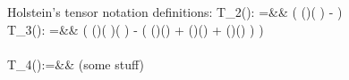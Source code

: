 Holstein's tensor notation definitions:
\bea
\textstyle 
T_2()\!:  \;\;\; \;\;\;
  =&&  \textstyle \!\!\!\! \!\!\!\!
  \left( (\cdot {})( \cdot {}) 
    -   \cdot {} \right)   \\
\textstyle 
T_3()\!: \;\;\; 
  =&&  \textstyle \!\!\!\! \!\!\!\!
  \left( (\cdot {})( \cdot {})( \cdot {}) 
    -  \left( (\cdot {})(\cdot{}) 
                       + (\cdot {})(\cdot{})
                       + (\cdot {})(\cdot{})
    \right) 
\right)  \nonumber \\ 
\\ 
T_4()\!: 
   =&& \!\!\!\! \!\!\!\!
  \textrm{(some stuff)}  
\eea




